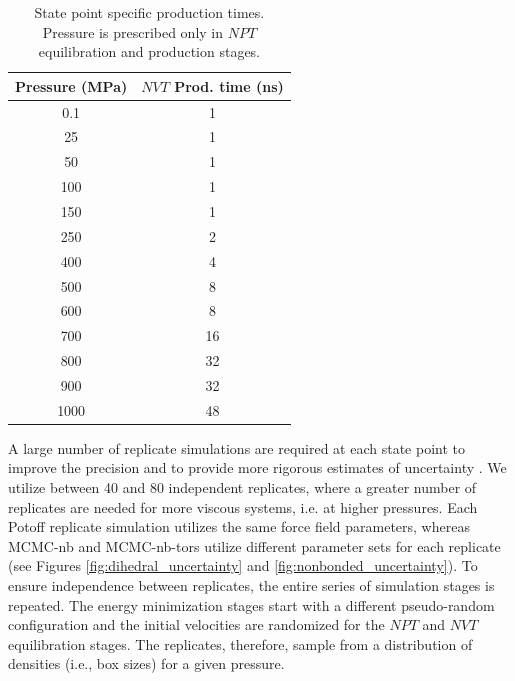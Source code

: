 \documentclass[preprint,review,12pt]{elsarticle}
\begin{document}
	\begin{table}[htb!]
		\caption{State point specific production times. Pressure is prescribed only in $NPT$ equilibration and production stages.} \label{tab:production times}
		\begin{center}
			\begin{tabular}{|c|c|}
				\hline
				Pressure (MPa) & $NVT$ Prod. time (ns) \\ \hline
				0.1 & 1 \\
				25 & 1 \\
				50 & 1 \\
				100 & 1 \\			     
				150 & 1 \\
				250 & 2 \\
				400 & 4 \\
				500 & 8 \\
				600 & 8 \\			     
				700 & 16 \\
				800 & 32 \\
				900 & 32 \\
				1000 & 48 \\
				\hline        
			\end{tabular}
		\end{center}
	\end{table}
	
	A large number of replicate simulations are required at each state point to improve the precision and to provide more rigorous estimates of uncertainty \cite{Maginn2018,Zhang2015}. We utilize between 40 and 80 independent replicates, where a greater number of replicates are needed for more viscous systems, i.e. at higher pressures. Each Potoff replicate simulation utilizes the same force field parameters, whereas MCMC-nb and MCMC-nb-tors utilize different parameter sets for each replicate (see Figures \ref{fig:dihedral_uncertainty} and \ref{fig:nonbonded_uncertainty}). To ensure independence between replicates, the entire series of simulation stages is repeated. The energy minimization stages start with a different pseudo-random configuration and the initial velocities are randomized for the $NPT$ and $NVT$ equilibration stages. The replicates, therefore, sample from a distribution of densities (i.e., box sizes) for a given pressure. 
	
	
	
\end{document}
